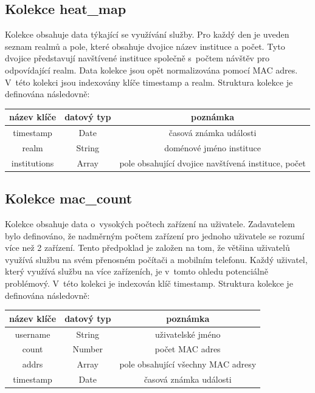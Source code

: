 \documentclass[thesis=M,czech]{FITthesis}[2012/06/26]
\begin{document}
    \subsection{Kolekce heat\_map}
      
      Kolekce obsahuje data týkající se využívání služby.
      Pro každý den je uveden seznam realmů a pole, 
      které obsahuje dvojice název instituce a počet.
      Tyto dvojice představují navštívené instituce společně s~počtem návštěv pro odpovídající realm.
      Data kolekce jsou opět normalizována pomocí MAC adres.
      V~této kolekci jsou indexovány klíče timestamp a realm.
      Struktura kolekce je definována následovně:
    
      \begin{center}
        \begin{tabular}{ | c | c | c | }
          \hline
            název klíče   & datový typ & poznámka                  \\ \hline
            timestamp     & Date       & časová známka události    \\ \hline
            realm         & String     & doménové jméno instituce  \\ \hline
            institutions  & Array      & pole obsahující dvojice navštívená instituce, počet \\
          \hline
        \end{tabular}
      \end{center}
    
    \subsection{Kolekce mac\_count}

      Kolekce obsahuje data o~vysokých počtech zařízení na uživatele.
      Zadavatelem bylo definováno, že nadměrným počtem zařízení pro jednoho uživatele se rozumí více než 2 zařízení.
      Tento předpoklad je založen na tom, že většina uživatelů využívá službu na svém přenosném počítači a mobilním telefonu.
      Každý uživatel, který využívá službu na více zařízeních, je v~tomto ohledu potenciálně problémový.
      V~této kolekci je indexován klíč timestamp. 
      Struktura kolekce je definována následovně:
    
      \begin{center}
        \begin{tabular}{ | c | c | c | }
          \hline
            název klíče   & datový typ & poznámka                             \\ \hline
            username      & String     & uživatelské jméno                    \\ \hline
            count         & Number     & počet MAC adres                      \\ \hline
            addrs         & Array      & pole obsahující všechny MAC adresy   \\ \hline
            timestamp     & Date       & časová známka události               \\
          \hline
        \end{tabular}
      \end{center}
    
\end{document}

